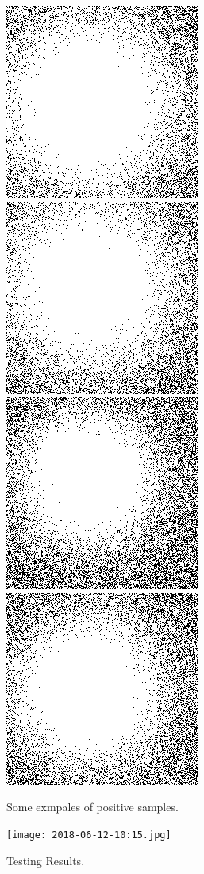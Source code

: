 \documentclass[a4paper,fleqn,usenatbib]{mnras}
\begin{document}
\begin{figure}
  \includegraphics[scale=0.4]{p9.png}
  \includegraphics[scale=0.4]{p10.png}
  \includegraphics[scale=0.4]{p11.png}
  \includegraphics[scale=0.4]{p12.png}

  \caption{Some exmpales of positive samples.}
\label{ps}
\end{figure}

\begin{figure}

  \texttt{[image: 2018-06-12-10:15.jpg]}


  \caption{Testing Results.}
\label{ps}
\end{figure}
\end{document}
